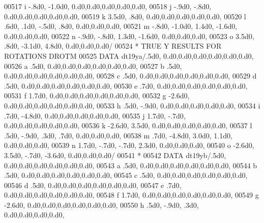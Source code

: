 \begin{DoxyCode}
00517      i           -.8d0, -1.0d0,             0.d0,0.d0,0.d0,0.d0,0.d0,
00518      j           -.9d0,  -.8d0,             0.d0,0.d0,0.d0,0.d0,0.d0,
00519      k           3.5d0,   .8d0,             0.d0,0.d0,0.d0,0.d0,0.d0,
00520      l            .6d0,   .1d0,  -.5d0,   .8d0,          0.d0,0.d0,0.d0,
00521      m           -.8d0, -1.0d0,  1.4d0, -1.6d0,          0.d0,0.d0,0.d0,
00522      n           -.9d0,  -.8d0,  1.3d0, -1.6d0,          0.d0,0.d0,0.d0,
00523      o           3.5d0,   .8d0, -3.1d0,  4.8d0,          0.d0,0.d0,0.d0/
00524 \textcolor{comment}{*                        TRUE Y RESULTS FOR ROTATIONS DROTM}
00525       \textcolor{keyword}{DATA} dt19ya/.5d0,                  0.d0,0.d0,0.d0,0.d0,0.d0,0.d0,
00526      a            .5d0,                  0.d0,0.d0,0.d0,0.d0,0.d0,0.d0,
00527      b            .5d0,                  0.d0,0.d0,0.d0,0.d0,0.d0,0.d0,
00528      c            .5d0,                  0.d0,0.d0,0.d0,0.d0,0.d0,0.d0,
00529      d            .5d0,                  0.d0,0.d0,0.d0,0.d0,0.d0,0.d0,
00530      e            .7d0,                  0.d0,0.d0,0.d0,0.d0,0.d0,0.d0,
00531      f           1.7d0,                  0.d0,0.d0,0.d0,0.d0,0.d0,0.d0,
00532      g          -2.6d0,                  0.d0,0.d0,0.d0,0.d0,0.d0,0.d0,
00533      h            .5d0,  -.9d0,             0.d0,0.d0,0.d0,0.d0,0.d0,
00534      i            .7d0, -4.8d0,             0.d0,0.d0,0.d0,0.d0,0.d0,
00535      j           1.7d0,  -.7d0,             0.d0,0.d0,0.d0,0.d0,0.d0,
00536      k          -2.6d0,  3.5d0,             0.d0,0.d0,0.d0,0.d0,0.d0,
00537      l            .5d0,  -.9d0,   .3d0,   .7d0,          0.d0,0.d0,0.d0,
00538      m            .7d0, -4.8d0,  3.0d0,  1.1d0,          0.d0,0.d0,0.d0,
00539      n           1.7d0,  -.7d0,  -.7d0,  2.3d0,          0.d0,0.d0,0.d0,
00540      o          -2.6d0,  3.5d0,  -.7d0, -3.6d0,          0.d0,0.d0,0.d0/
00541 \textcolor{comment}{*}
00542       \textcolor{keyword}{DATA} dt19yb/.5d0,                  0.d0,0.d0,0.d0,0.d0,0.d0,0.d0,
00543      a            .5d0,                  0.d0,0.d0,0.d0,0.d0,0.d0,0.d0,
00544      b            .5d0,                  0.d0,0.d0,0.d0,0.d0,0.d0,0.d0,
00545      c            .5d0,                  0.d0,0.d0,0.d0,0.d0,0.d0,0.d0,
00546      d            .5d0,                  0.d0,0.d0,0.d0,0.d0,0.d0,0.d0,
00547      e            .7d0,                  0.d0,0.d0,0.d0,0.d0,0.d0,0.d0,
00548      f           1.7d0,                  0.d0,0.d0,0.d0,0.d0,0.d0,0.d0,
00549      g          -2.6d0,                  0.d0,0.d0,0.d0,0.d0,0.d0,0.d0,
00550      h            .5d0,  -.9d0,   .3d0,             0.d0,0.d0,0.d0,0.d0,

\end{DoxyCode}
